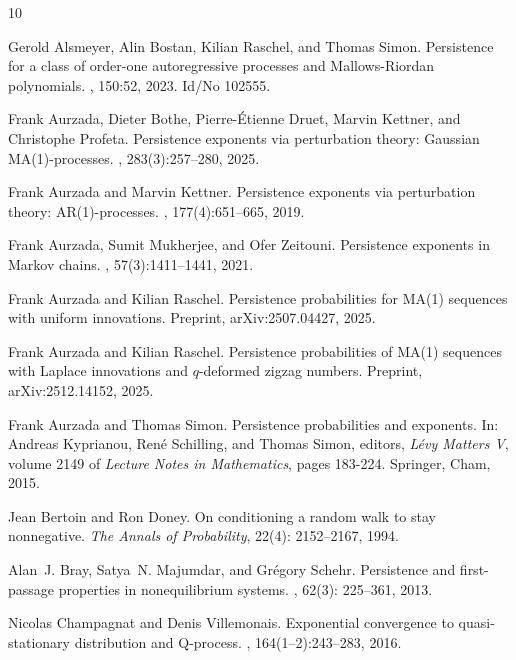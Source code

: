 \documentclass[12pt]{article}
\newcommand{\1}{\mathds{1}}
\theoremstyle{definition}
\theoremstyle{plain}
\theoremstyle{remark}
\begin{document}
\begin{thebibliography}{10}

Gerold Alsmeyer, Alin Bostan, Kilian Raschel, and Thomas Simon.
\newblock Persistence for a class of order-one autoregressive processes and
  {Mallows}-{Riordan} polynomials.
, 150:52, 2023.
\newblock Id/No 102555.



Frank Aurzada, Dieter Bothe, Pierre-\'Etienne Druet, Marvin Kettner, and
  Christophe Profeta.
\newblock Persistence exponents via perturbation theory: {G}aussian
  {MA}(1)-processes.
, 283(3):257--280, 2025.

Frank Aurzada and Marvin Kettner.
\newblock Persistence exponents via perturbation theory: {AR}(1)-processes.
, 177(4):651--665, 2019.

Frank Aurzada, Sumit Mukherjee, and Ofer Zeitouni.
\newblock Persistence exponents in {Markov} chains.
, 57(3):1411--1441,
  2021.

Frank Aurzada and Kilian Raschel.
\newblock Persistence probabilities for MA(1) sequences with uniform innovations. Preprint,
  arXiv:2507.04427, 2025.

Frank Aurzada and Kilian Raschel.
\newblock Persistence probabilities of MA(1) sequences with Laplace innovations and $q$-deformed zigzag numbers. Preprint, arXiv:2512.14152, 2025.
     

Frank Aurzada and Thomas Simon.
\newblock Persistence probabilities and exponents.
\newblock In: Andreas Kyprianou, Ren{\'e} Schilling, and Thomas Simon, editors,
  {\em L\'evy Matters V}, volume 2149 of {\em Lecture Notes in Mathematics},
  pages 183-224. Springer, Cham, 2015.

Jean Bertoin and Ron Doney.
\newblock On conditioning a random walk to stay nonnegative. {\em The Annals of Probability}, 22(4): 2152--2167, 1994.

Alan~J. Bray, Satya~N. Majumdar, and Gr{\'e}gory Schehr.
\newblock Persistence and first-passage properties in nonequilibrium systems.
, 62(3): 225--361, 2013.


Nicolas Champagnat and Denis Villemonais.
\newblock Exponential convergence to quasi-stationary distribution and {Q}-process.
, 164(1--2):243--283, 2016.


\end{thebibliography}
\end{document}
